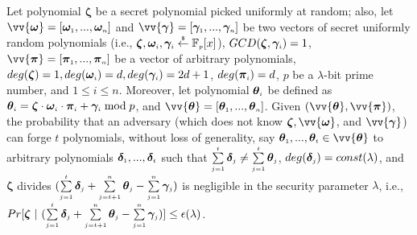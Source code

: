 \begin{theorem}\label{Unforgeable-Polynomials-Linear-Combination}
%
 Let polynomial $\bm\zeta$ be a secret polynomial picked uniformly at random; also, let   $\vv{\bm\omega}=[\bm\omega_{\st 1},..., \bm\omega_{\st n}]$ and $\vv{\bm\gamma}=[\bm\gamma_{\st 1},..., \bm\gamma_{\st n}]$ be two vectors of secret uniformly random polynomials (i.e., ${\bm\zeta}, \bm\omega_{\scriptscriptstyle i}, \bm\gamma_{\scriptscriptstyle i} \stackrel{\scriptscriptstyle\$}\leftarrow \mathbb F_{\scriptscriptstyle p}[x]$), $GCD(\bm\zeta,  \bm\gamma_{\scriptscriptstyle i})=1$,  $\vv{\bm\pi}=[\bm\pi_{\st 1},..., \bm\pi_{\st n}]$ be a vector of arbitrary polynomials,   $deg(\bm\zeta)= 1, deg(\bm\omega_{\scriptscriptstyle i})=d,  deg(\bm\gamma_{\scriptscriptstyle i})= 2d+1$,  $deg(\bm\pi_{\scriptscriptstyle i})=d$,  $p$ be a $\lambda$-bit prime number, and $1\leq i \leq n$. Moreover, let polynomial $\bm\theta_{\scriptscriptstyle i}$ be defined as  $\bm\theta_{\scriptscriptstyle i}=\bm\zeta\cdot \bm\omega_{\scriptscriptstyle i}\cdot \bm\pi_{\scriptscriptstyle i}+ \bm\gamma_{\scriptscriptstyle i} \bmod p$, and $\vv{\bm\theta} = [\bm\theta_{\st 1},..., \bm\theta_{\st n}]$.  Given $(\vv{\bm\theta}, \vv{\bm\pi})$, the probability that an adversary (which does not know $\bm\zeta, \vv{\bm\omega}$, and $\vv{\bm\gamma}$) can forge $t$ polynomials, without loss of generality, say $\bm\theta_{\st 1},..., \bm\theta_{\st t} \in \vv{\bm\theta}$ to arbitrary polynomials $\bm\delta_{\scriptscriptstyle 1},..., \bm\delta_{\scriptscriptstyle t}$ such that   $\sum\limits_{\scriptscriptstyle j=1}^{\scriptscriptstyle t}\bm\delta_{\scriptscriptstyle j}\neq \sum\limits_{\scriptscriptstyle j=1}^{\scriptscriptstyle t}\bm\theta_{\scriptscriptstyle j}$, $deg(\bm\delta_{\scriptscriptstyle j})= const(\lambda)$, and $\bm\zeta$ divides $(\sum\limits_{\scriptscriptstyle j=1}^{\scriptscriptstyle t}\bm\delta_{\scriptscriptstyle j} + \sum\limits_{\scriptscriptstyle j=t+1}^{\scriptscriptstyle n}\bm\theta_{\scriptscriptstyle j} - \sum\limits_{\scriptscriptstyle j=1}^{\scriptscriptstyle n}\bm\gamma_{\scriptscriptstyle j} )$ is negligible in the security parameter $\lambda$, i.e.,  
%
$Pr[ \bm\zeta \ | \ (\sum\limits_{\scriptscriptstyle j=1}^{\scriptscriptstyle t}\bm\delta_{\scriptscriptstyle j} + \sum\limits_{\scriptscriptstyle j=t+1}^{\scriptscriptstyle n}\bm\theta_{\scriptscriptstyle j} - \sum\limits_{\scriptscriptstyle j=1}^{\scriptscriptstyle n}\bm\gamma_{\scriptscriptstyle j} ) ]\leq \epsilon(\lambda)$.
%
\end{theorem}



